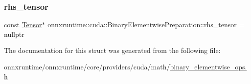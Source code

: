 \subsubsection{\texorpdfstring{rhs\+\_\+tensor}{rhs\_tensor}}
{\footnotesize\ttfamily const \mbox{\hyperlink{classonnxruntime_1_1Tensor}{Tensor}}$\ast$ onnxruntime\+::cuda\+::\+Binary\+Elementwise\+Preparation\+::rhs\+\_\+tensor = nullptr}



The documentation for this struct was generated from the following file\+:\begin{DoxyCompactItemize}
\item 
onnxruntime/onnxruntime/core/providers/cuda/math/\mbox{\hyperlink{binary__elementwise__ops_8h}{binary\+\_\+elementwise\+\_\+ops.\+h}}\end{DoxyCompactItemize}
